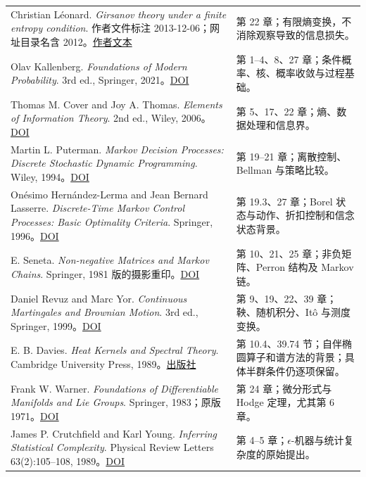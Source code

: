 \documentclass[
  11pt,
  oneside]{book}
\begin{document}
{\begin{longtable}[]{@{}
  >{\raggedright\arraybackslash}p{}
  >{\raggedright\arraybackslash}p{}@{}}
Christian Léonard. \emph{Girsanov theory under a finite entropy condition}. 作者文件标注 2013-12-06；网址目录名含 2012。\href{https://leonard.perso.math.cnrs.fr/papers/2012-Leonard-Girsanov\%20theory\%20under\%20a\%20finite\%20entropy\%20condition.pdf}{作者文本} & 第 22 章；有限熵变换，不消除观察导致的信息损失。 \\
Olav Kallenberg. \emph{Foundations of Modern Probability}. 3rd ed., Springer, 2021。\href{https://doi.org/10.1007/978-3-030-61871-1}{DOI} & 第 1--4、8、27 章；条件概率、核、概率收敛与过程基础。 \\
Thomas M. Cover and Joy A. Thomas. \emph{Elements of Information Theory}. 2nd ed., Wiley, 2006。\href{https://doi.org/10.1002/047174882X}{DOI} & 第 5、17、22 章；熵、数据处理和信息界。 \\
Martin L. Puterman. \emph{Markov Decision Processes: Discrete Stochastic Dynamic Programming}. Wiley, 1994。\href{https://doi.org/10.1002/9780470316887}{DOI} & 第 19--21 章；离散控制、Bellman 与策略比较。 \\
Onésimo Hernández-Lerma and Jean Bernard Lasserre. \emph{Discrete-Time Markov Control Processes: Basic Optimality Criteria}. Springer, 1996。\href{https://doi.org/10.1007/978-1-4612-0729-0}{DOI} & 第 19.3、27 章；Borel 状态与动作、折扣控制和信念状态背景。 \\
E. Seneta. \emph{Non-negative Matrices and Markov Chains}. Springer, 1981 版的摄影重印。\href{https://doi.org/10.1007/0-387-32792-4}{DOI} & 第 10、21、25 章；非负矩阵、Perron 结构及 Markov 链。 \\
Daniel Revuz and Marc Yor. \emph{Continuous Martingales and Brownian Motion}. 3rd ed., Springer, 1999。\href{https://doi.org/10.1007/978-3-662-06400-9}{DOI} & 第 9、19、22、39 章；鞅、随机积分、Itô 与测度变换。 \\
E. B. Davies. \emph{Heat Kernels and Spectral Theory}. Cambridge University Press, 1989。\href{https://www.cambridge.org/core/books/heat-kernels-and-spectral-theory/39DC7EE2A5DCCE9DEF581D2F52A73E1F}{出版社} & 第 10.4、39.74 节；自伴椭圆算子和谱方法的背景；具体半群条件仍逐项保留。 \\
Frank W. Warner. \emph{Foundations of Differentiable Manifolds and Lie Groups}. Springer, 1983；原版 1971。\href{https://doi.org/10.1007/978-1-4757-1799-0}{DOI} & 第 24 章；微分形式与 Hodge 定理，尤其第 6 章。 \\
James P. Crutchfield and Karl Young. \emph{Inferring Statistical Complexity}. Physical Review Letters 63(2):105--108, 1989。\href{https://doi.org/10.1103/PhysRevLett.63.105}{DOI} & 第 4--5 章；\(\epsilon\)-机器与统计复杂度的原始提出。 \\

\end{longtable}}
\end{document}
